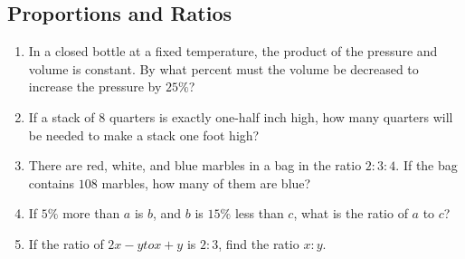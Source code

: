 \documentclass{article}
\begin{document}
    \subsection*{Proportions and Ratios}
    \begin{enumerate}[resume]
        \item In a closed bottle at a fixed temperature, the product of the
        pressure and volume is constant. By what percent must the volume be
        decreased to increase the pressure by $25\%$?
        \vspace{3cm}
        \item If a stack of $8$ quarters is exactly one-half inch high, how many
        quarters will be needed to make a stack one foot high?
        \vspace{3cm}
        \item There are red, white, and blue marbles in a bag in the ratio $2 :
        3 : 4$. If the bag contains $108$ marbles, how many of them are blue?
        \vspace{3cm}
        \item If $5\%$ more than $a$ is $b$, and $b$ is $15\%$ less than $c$,
        what is the ratio of $a$ to $c$?
        \vspace{3cm}
        \item If the ratio of $2x - y to x + y$ is $2 : 3$, find the ratio $x :
        y$.
        \vspace{3cm}
    \end{enumerate}
\end{document}
